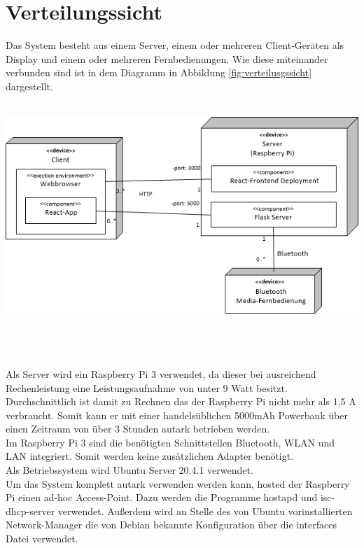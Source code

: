\chapter{Verteilungssicht}
Das System besteht aus einem Server, einem oder mehreren Client-Geräten als Display und einem oder mehreren Fernbedienungen. Wie diese miteinander verbunden sind ist in dem Diagramm in Abbildung \ref{fig:verteilusgssicht} dargestellt.\\
\\
\begin{minipage}{\textwidth} 
	\centering
	\includegraphics[width=\textwidth]{Bilder/Verteilungssicht.png}\\
	\label{fig:verteilusgssicht}
\end{minipage}
\\
\\
\\
Als Server wird ein Raspberry Pi 3 verwendet, da dieser bei ausreichend Rechenleistung eine Leistungsaufnahme von unter 9 Watt besitzt. Durchschnittlich ist damit zu Rechnen das der Raspberry Pi nicht mehr als 1,5 A verbraucht. Somit kann er mit einer handelsüblichen 5000mAh Powerbank über einen Zeitraum von über 3 Stunden autark betrieben werden. \\
Im Raspberry Pi 3 sind die benötigten Schnittstellen Bluetooth, WLAN und LAN integriert. Somit werden keine zusätzlichen Adapter benötigt.\\
Als Betriebssystem wird Ubuntu Server 20.4.1 verwendet.\\
Um das System komplett autark verwenden werden kann, hosted der Raspberry Pi einen ad-hoc Access-Point. Dazu werden die Programme \glqq hostapd\grqq{} und \glqq isc-dhcp-server\grqq{} verwendet. Außerdem wird an Stelle des von Ubuntu vorinstallierten Network-Manager die von Debian bekannte Konfiguration über die interfaces Datei verwendet.\\
